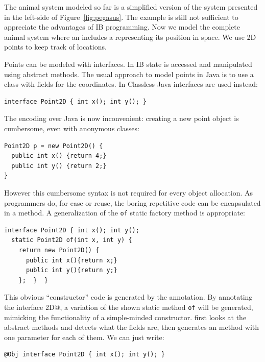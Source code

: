 The animal system modeled so far is a simplified version of the
system presented in the left-side of Figure~\ref{fig:pegasus}.
The example is still not sufficient to appreciate the advantages of IB
programming.
Now we model the complete animal system where an \Q@Animal@ includes a \Q@location@
representing its position in space. We use 2D points to keep track of locations.

Points can be modeled with interfaces.
 In IB
 state is accessed and
manipulated using abstract methods.  The usual approach to model
points in Java is to use a class with fields for the coordinates.
In Classless Java interfaces are used instead:

\begin{lstlisting}
interface Point2D { int x(); int y(); }
\end{lstlisting}

\noindent The encoding over Java is now inconvenient: creating a new point object is cumbersome, even
with anonymous classes:

\begin{lstlisting}
Point2D p = new Point2D() {
  public int x() {return 4;}
  public int y() {return 2;}
}
\end{lstlisting}

\noindent However this cumbersome syntax is not required for every
object allocation. As programmers do, for ease or reuse, the boring
repetitive code can be encapsulated in a method. A generalization of the
\texttt{of} static factory method is appropriate:%
\begin{lstlisting}
interface Point2D { int x(); int y();
  static Point2D of(int x, int y) {
    return new Point2D() {
      public int x(){return x;}
      public int y(){return y;}
    };  }  }
\end{lstlisting}

\vspace{-5pt}
This obvious ``constructor'' code is generated by the \mixin
annotation.  By annotating the interface \Q@Point2D@, a variation of the shown
static method \texttt{of} will be generated, mimicking the functionality of a
simple-minded constructor. \mixin first looks at the abstract methods and detects
what the fields are, then generates an \Q@of@ method with one parameter for each
of them. We can just write:

\begin{lstlisting}
@Obj interface Point2D { int x(); int y(); }
\end{lstlisting}

